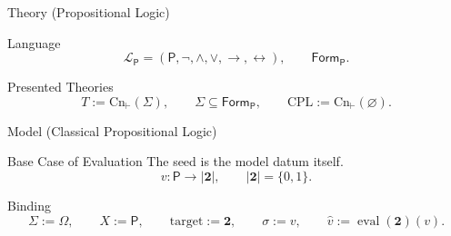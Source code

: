 \documentclass[12pt, a4paper]{report}
\begin{document}
\begin{modelbox}{Theory (Propositional Logic)}

\begin{modelcomponent}{Language}
\[
  \mathcal L_{\mathsf P}
  =
  (\mathsf P,\neg,\wedge,\vee,\to,\leftrightarrow),
  \qquad
  \mathsf{Form}_{\mathsf P}.
\]
\end{modelcomponent}

\begin{modelcomponent}{Presented Theories}
\[
  T:=\mathrm{Cn}_{\vdash}(\Sigma),
  \qquad
  \Sigma\subseteq\mathsf{Form}_{\mathsf P},
  \qquad
  \mathrm{CPL}:=\mathrm{Cn}_{\vdash}(\varnothing).
\]
\end{modelcomponent}

\begin{modelconsequences}
\end{modelconsequences}
\end{modelbox}

\begin{modelbox}{Model (Classical Propositional Logic)}
\begin{model}\label{model:classical-propositional-logic-sample}

\begin{modelcomponent}{Base Case of Evaluation}
The seed is the model datum itself.
\[
  v:\mathsf P\to\lvert\mathbf 2\rvert,
  \qquad
  \lvert\mathbf 2\rvert=\{0,1\}.
\]
\end{modelcomponent}

\begin{modelcomponent}{Binding}
\[
  \Sigma:=\Omega,
  \qquad
  X:=\mathsf P,
  \qquad
  \text{target}:=\mathbf 2,
  \qquad
  \sigma:=v,
  \qquad
  \widehat v:=\operatorname{eval}(\mathbf 2)(v).
\]
\end{modelcomponent}

\begin{modelbridge}
  \bridgeclause{\[
    v\models\varphi
    \quad:\Longleftrightarrow\quad
    \widehat v(\varphi)=1.
  \]}
\end{modelbridge}

\begin{modelconsequences}
\end{modelconsequences}
\end{model}
\end{modelbox}
\end{document}
